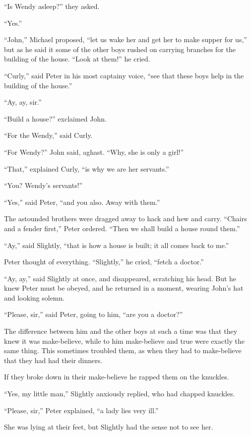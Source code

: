 ``Is Wendy asleep?'' they asked.

``Yes.''

``John,'' Michael proposed, ``let us wake her and get her to make supper
for us,'' but as he said it some of the other boys rushed on carrying
branches for the building of the house. ``Look at them!'' he cried.

``Curly,'' said Peter in his most captainy voice, ``see that these boys
help in the building of the house.''

``Ay, ay, sir.''

``Build a house?'' exclaimed John.

``For the Wendy,'' said Curly.

``For Wendy?'' John said, aghast. ``Why, she is only a girl!''

``That,'' explained Curly, ``is why we are her servants.''

``You? Wendy's servants!''

``Yes,'' said Peter, ``and you also. Away with them.''

The astounded brothers were dragged away to hack and hew and carry.
``Chairs and a fender first,'' Peter ordered. ``Then we shall build a
house round them.''

``Ay,'' said Slightly, ``that is how a house is built; it all comes back
to me.''

Peter thought of everything. ``Slightly,'' he cried, ``fetch a doctor.''

``Ay, ay,'' said Slightly at once, and disappeared, scratching his head.
But he knew Peter must be obeyed, and he returned in a moment, wearing
John's hat and looking solemn.

``Please, sir,'' said Peter, going to him, ``are you a doctor?''

The difference between him and the other boys at such a time was that
they knew it was make-believe, while to him make-believe and true were
exactly the same thing. This sometimes troubled them, as when they had
to make-believe that they had had their dinners.

If they broke down in their make-believe he rapped them on the
knuckles.

``Yes, my little man,'' Slightly anxiously replied, who had chapped
knuckles.

``Please, sir,'' Peter explained, ``a lady lies very ill.''

She was lying at their feet, but Slightly had the sense not to see her.

